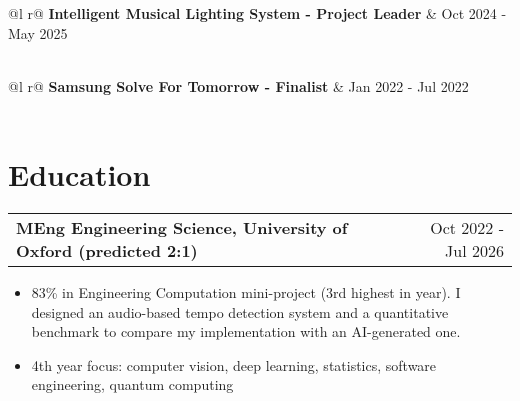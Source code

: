\documentclass[a4paper,10pt]{article}
\makeatletter
\newenvironment{joblong}[2]
    {
    \begin{tabularx}{\linewidth}{@{}l X r@{}}
    \textbf{#1} & \hfill &  #2 \\[2pt]
    \end{tabularx}
    \begin{minipage}[t]{\linewidth}
    \begin{itemize}[nosep,after=\strut, leftmargin=1em, itemsep=1pt,label=--]
    }
    {
    \end{itemize}
    \end{minipage}    
    }
\makeatother
\begin{document}
\begin{tabularx}{\linewidth}{ @{}l r@{} }
\textbf{Intelligent Musical Lighting System - Project Leader} & \hfill Oct 2024 - May 2025 \\[2pt]
  \\
\end{tabularx}

\vspace{1pt}

\begin{tabularx}{\linewidth}{ @{}l r@{} }
\textbf{Samsung Solve For Tomorrow - Finalist} & \hfill Jan 2022 - Jul 2022 \\[2pt]
  \\
\end{tabularx}

\vspace{12pt}

\section{Education}

\begin{joblong}{MEng Engineering Science, University of Oxford (predicted 2:1)}{Oct 2022 - Jul 2026}
\item 83\% in Engineering Computation mini-project (3rd highest in year). I designed an audio-based tempo detection system and a quantitative benchmark to compare my implementation with an AI-generated one.
\item 4th year focus: computer vision, deep learning, statistics, software engineering, quantum computing
\end{joblong}

\vspace{12pt}

\end{document}
